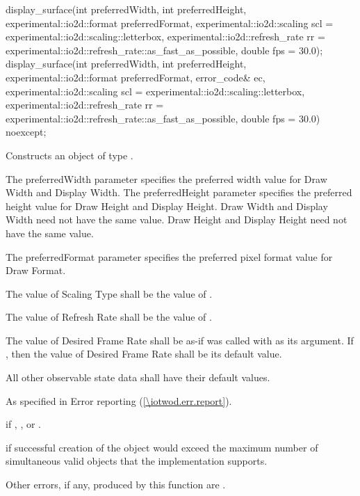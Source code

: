 \begin{itemdecl}
display_surface(int preferredWidth, int preferredHeight, 
  experimental::io2d::format preferredFormat,
  experimental::io2d::scaling scl = experimental::io2d::scaling::letterbox,
  experimental::io2d::refresh_rate rr =
  experimental::io2d::refresh_rate::as_fast_as_possible, double fps = 30.0);
display_surface(int preferredWidth, int preferredHeight, 
  experimental::io2d::format preferredFormat, error_code& ec,
  experimental::io2d::scaling scl = experimental::io2d::scaling::letterbox,
  experimental::io2d::refresh_rate rr =
  experimental::io2d::refresh_rate::as_fast_as_possible, double fps = 30.0)
  noexcept;
\end{itemdecl}
\begin{itemdescr}
\pnum
\effects
Constructs an object of type .

\pnum
The preferredWidth parameter specifies the preferred width value for Draw Width and Display Width. The preferredHeight parameter specifies the preferred height value for Draw Height and Display Height. Draw Width and Display Width need not have the same value. Draw Height and Display Height need not have the same value.

\pnum
The preferredFormat parameter specifies the preferred pixel format value for Draw Format.

\pnum
The value of Scaling Type shall be the value of .

\pnum
The value of Refresh Rate shall be the value of .

\pnum
The value of Desired Frame Rate shall be as-if  was called with  as its argument. If , then the value of Desired Frame Rate shall be its default value.

\pnum
All other observable state data shall have their default values.

\pnum
\throws
As specified in Error reporting (\ref{\iotwod.err.report}).

\pnum
\errors
{} if , , or .

 if successful creation of the  object would exceed the maximum number of simultaneous valid  objects that the implementation supports.

\pnum
Other errors, if any, produced by this function are .
\end{itemdescr}

